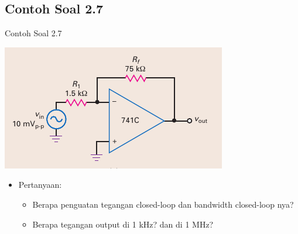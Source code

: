 
\subsection{Contoh Soal 2.7}

\begin{frame}[t]{Contoh Soal 2.7}
	\begin{multicols}{2}
		\begin{center}
			\includegraphics[width=\linewidth]{gambar/fig-16.16a}
		\end{center}
		\columnbreak
		\begin{itemize}
			\item Pertanyaan:
			\begin{itemize}
				\item Berapa penguatan tegangan closed-loop dan bandwidth closed-loop nya?
				\item Berapa tegangan output di 1 kHz? dan di 1 MHz?
			\end{itemize}
		\end{itemize}
	\end{multicols}
\end{frame}

